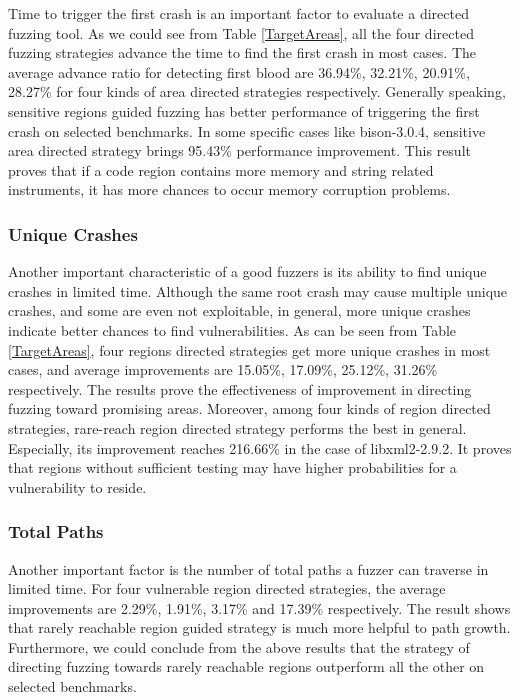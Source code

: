 Time to trigger the first crash is an important factor to evaluate a directed fuzzing tool. As we could see from Table \ref{TargetAreas}, all the four directed fuzzing strategies advance the time to find the first crash in most cases. The average advance ratio for detecting first blood are 36.94\%, 32.21\%, 20.91\%, 28.27\% for four kinds of area directed strategies respectively. Generally speaking, sensitive regions guided fuzzing has better performance of triggering the first crash on selected benchmarks. In some specific cases like bison-3.0.4, sensitive area directed strategy brings 95.43\% performance improvement. This result proves that if a code region contains more memory and string related instruments, it has more chances to occur memory corruption problems.

\subsubsection{Unique Crashes}
Another important characteristic of a good fuzzers is its ability to find unique crashes in limited time. Although the same root crash may cause multiple unique crashes, and some are even not exploitable, in general, more unique crashes indicate better chances to find vulnerabilities. 
As can be seen from Table \ref{TargetAreas}, four regions directed strategies get more unique crashes in most cases, and average improvements are 15.05\%, 17.09\%, 25.12\%, 31.26\% respectively. The results prove the effectiveness of improvement in directing fuzzing toward promising areas. Moreover, among four kinds of region directed strategies, rare-reach region directed strategy performs the best in general. Especially, its improvement reaches 216.66\% in the case of libxml2-2.9.2. It proves that regions without sufficient testing may have higher probabilities for a vulnerability to reside.

\subsubsection{Total Paths}
Another important factor is the number of total paths a fuzzer can traverse in limited time. For four vulnerable region directed strategies, the average improvements are 2.29\%, 1.91\%, 3.17\% and 17.39\% respectively. The result shows that rarely reachable region guided strategy is much more helpful to path growth. Furthermore, we could conclude from the above results that the strategy of directing fuzzing towards rarely reachable regions outperform all the other on selected benchmarks.



